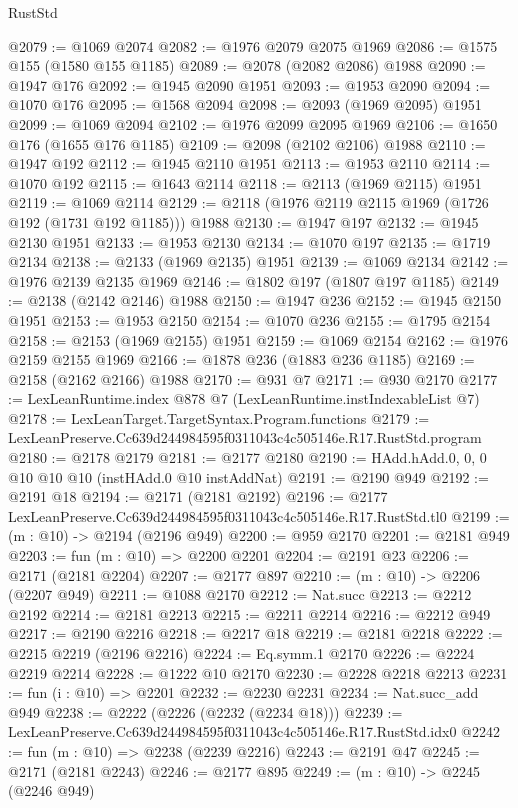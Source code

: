 \begin{lexlean}{RustStd}
\begin{coremodule}
@2079 := @1069 @2074
@2082 := @1976 @2079 @2075 @1969
@2086 := @1575 @155 (@1580 @155 @1185)
@2089 := @2078 (@2082 @2086) @1988
@2090 := @1947 @176
@2092 := @1945 @2090 @1951
@2093 := @1953 @2090
@2094 := @1070 @176
@2095 := @1568 @2094
@2098 := @2093 (@1969 @2095) @1951
@2099 := @1069 @2094
@2102 := @1976 @2099 @2095 @1969
@2106 := @1650 @176 (@1655 @176 @1185)
@2109 := @2098 (@2102 @2106) @1988
@2110 := @1947 @192
@2112 := @1945 @2110 @1951
@2113 := @1953 @2110
@2114 := @1070 @192
@2115 := @1643 @2114
@2118 := @2113 (@1969 @2115) @1951
@2119 := @1069 @2114
@2129 := @2118 (@1976 @2119 @2115 @1969 (@1726 @192 (@1731 @192 @1185))) @1988
@2130 := @1947 @197
@2132 := @1945 @2130 @1951
@2133 := @1953 @2130
@2134 := @1070 @197
@2135 := @1719 @2134
@2138 := @2133 (@1969 @2135) @1951
@2139 := @1069 @2134
@2142 := @1976 @2139 @2135 @1969
@2146 := @1802 @197 (@1807 @197 @1185)
@2149 := @2138 (@2142 @2146) @1988
@2150 := @1947 @236
@2152 := @1945 @2150 @1951
@2153 := @1953 @2150
@2154 := @1070 @236
@2155 := @1795 @2154
@2158 := @2153 (@1969 @2155) @1951
@2159 := @1069 @2154
@2162 := @1976 @2159 @2155 @1969
@2166 := @1878 @236 (@1883 @236 @1185)
@2169 := @2158 (@2162 @2166) @1988
@2170 := @931 @7
@2171 := @930 @2170
@2177 := LexLeanRuntime.index @878 @7 (LexLeanRuntime.instIndexableList @7)
@2178 := LexLeanTarget.TargetSyntax.Program.functions
@2179 := LexLeanPreserve.Cc639d244984595f0311043c4c505146e.R17.RustStd.program
@2180 := @2178 @2179
@2181 := @2177 @2180
@2190 := HAdd.hAdd.{0, 0, 0} @10 @10 @10 (instHAdd.{0} @10 instAddNat)
@2191 := @2190 @949
@2192 := @2191 @18
@2194 := @2171 (@2181 @2192)
@2196 := @2177 LexLeanPreserve.Cc639d244984595f0311043c4c505146e.R17.RustStd.tl0
@2199 := (m : @10) -> @2194 (@2196 @949)
@2200 := @959 @2170
@2201 := @2181 @949
@2203 := fun (m : @10) => @2200 @2201
@2204 := @2191 @23
@2206 := @2171 (@2181 @2204)
@2207 := @2177 @897
@2210 := (m : @10) -> @2206 (@2207 @949)
@2211 := @1088 @2170
@2212 := Nat.succ
@2213 := @2212 @2192
@2214 := @2181 @2213
@2215 := @2211 @2214
@2216 := @2212 @949
@2217 := @2190 @2216
@2218 := @2217 @18
@2219 := @2181 @2218
@2222 := @2215 @2219 (@2196 @2216)
@2224 := Eq.symm.{1} @2170
@2226 := @2224 @2219 @2214
@2228 := @1222 @10 @2170
@2230 := @2228 @2218 @2213
@2231 := fun (i : @10) => @2201
@2232 := @2230 @2231
@2234 := Nat.succ_add @949
@2238 := @2222 (@2226 (@2232 (@2234 @18)))
@2239 := LexLeanPreserve.Cc639d244984595f0311043c4c505146e.R17.RustStd.idx0
@2242 := fun (m : @10) => @2238 (@2239 @2216)
@2243 := @2191 @47
@2245 := @2171 (@2181 @2243)
@2246 := @2177 @895
@2249 := (m : @10) -> @2245 (@2246 @949)

\end{coremodule}
\end{lexlean}

